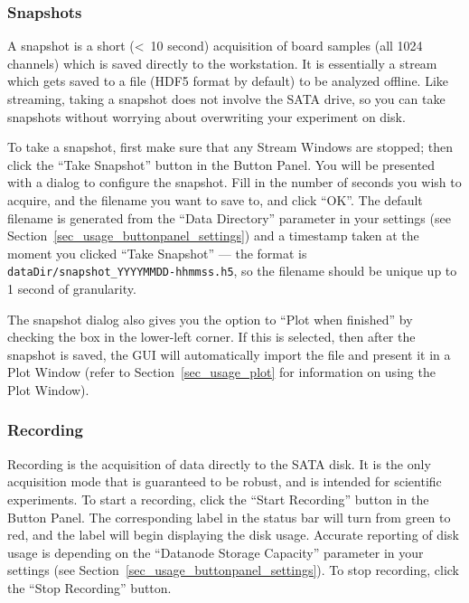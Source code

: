 \subsubsection{Snapshots}
\label{sec_usage_buttonpanel_snapshot}

A snapshot is a short (\textless~10 second) acquisition of board samples (all 1024 channels) which is saved directly to the workstation. It is essentially a stream which gets saved to a file (HDF5 format by default) to be analyzed offline. Like streaming, taking a snapshot does not involve the SATA drive, so you can take snapshots without worrying about overwriting your experiment on disk.

To take a snapshot, first make sure that any Stream Windows are stopped; then click the ``Take Snapshot'' button in the Button Panel. You will be presented with a dialog to configure the snapshot. Fill in the number of seconds you wish to acquire, and the filename you want to save to, and click ``OK''. The default filename is generated from the ``Data Directory'' parameter in your settings (see Section~\ref{sec_usage_buttonpanel_settings}) and a timestamp taken at the moment you clicked ``Take Snapshot'' --- the format is \texttt{dataDir/snapshot\_YYYYMMDD-hhmmss.h5}, so the filename should be unique up to 1 second of granularity.

The snapshot dialog also gives you the option to ``Plot when finished'' by checking the box in the lower-left corner. If this is selected, then after the snapshot is saved, the GUI will automatically import the file and present it in a Plot Window (refer to Section~\ref{sec_usage_plot} for information on using the Plot Window).

\subsubsection{Recording}
\label{sec_usage_buttonpanel_recording}

Recording is the acquisition of data directly to the SATA disk. It is the only acquisition mode that is guaranteed to be robust, and is intended for scientific experiments. To start a recording, click the ``Start Recording'' button in the Button Panel. The corresponding label in the status bar will turn from green to red, and the label will begin displaying the disk usage. Accurate reporting of disk usage is depending on the ``Datanode Storage Capacity'' parameter in your settings (see Section~\ref{sec_usage_buttonpanel_settings}). To stop recording, click the ``Stop Recording'' button.

